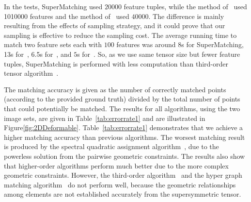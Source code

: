 In the tests, SuperMatching used $20000$ feature tuples, while the method of~\cite{Duchenne09} used 1010000 features  and the method of~\cite{Zass08} used $40000$.
The difference is mainly resulting from the effects of sampling strategy, and it could prove that our sampling is effective to reduce the sampling cost.
The average running time to match two feature sets each with $100$ features was around 8s for SuperMatching, 13s for~\cite{Duchenne09}, 6.5s for~\cite{Zass08}, and $5$s for~\cite{Cour06}.
So, as we use same tensor size but fewer feature tuples, SuperMatching is performed with less computation than third-order tensor algorithm~\cite{Duchenne09}.

The matching accuracy is given as the number of correctly matched points (according to the provided ground truth) divided by the total number of points that could potentially be matched.
The results for all algorithms, using the two image sets, are given in Table~\ref{tab:errorrate1} and are illustrated in Figure\ref{fig:2DDeformable}.
Table~\ref{tab:errorrate1} demonstrates that we achieve a higher matching accuracy than previous algorithms.
The worsest matching result is produced by the spectral quadratic assignment algorithm~\cite{Cour06},
due to the powerless solution from the pairwise geometric constraints.
The results also show that higher-order algorithms perform much better due to the more complex geometric constraints.
However, the third-order algorithm~\cite{Duchenne09} and the hyper graph matching algorithm~\cite{Zass08} do not perform well,
because the geometric relationships among elements are not established accurately from the supersymmetric tensor.

